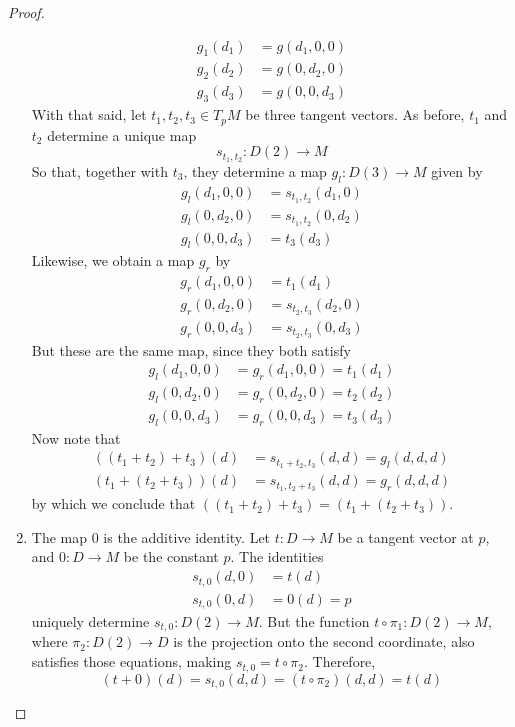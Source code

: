 \begin{proof}
\begin{enumerate}
\begin{align*}
	g_1(d_1) &= g(d_1,0,0) \\
	g_2(d_2) &= g(0,d_2,0) \\
	g_3(d_3) &= g(0,0,d_3)
      \end{align*}
      With that said, let \( t_1,t_2,t_3\in T_pM \) be three tangent vectors. As before, \( t_1 \) and \( t_2 \) determine a unique map
      \begin{equation*}
	s_{t_1,t_2}:D(2)\to M
      \end{equation*}
      So that, together with \( t_3 \), they determine a map \( g_l:D(3)\to M \) given by
      \begin{align*}
	g_l(d_1,0,0) &= s_{t_1,t_2}(d_1,0) \\
	g_l(0,d_2,0) &= s_{t_1,t_2}(0,d_2) \\
	g_l(0,0,d_3) &= t_3(d_3)
      \end{align*}
      Likewise, we obtain a map \( g_r \) by
      \begin{align*}
	g_r(d_1,0,0) &= t_1(d_1)           \\
	g_r(0,d_2,0) &= s_{t_2,t_3}(d_2,0) \\
	g_r(0,0,d_3) &= s_{t_2,t_3}(0,d_3)
      \end{align*}
      But these are the same map, since they both satisfy
      \begin{align*}
	g_l(d_1,0,0) &= g_r(d_1,0,0) = t_1(d_1) \\
	g_l(0,d_2,0) &= g_r(0,d_2,0) = t_2(d_2) \\
	g_l(0,0,d_3) &= g_r(0,0,d_3) = t_3(d_3)
      \end{align*}
      Now note that
      \begin{align*}
	((t_1+t_2)+t_3)(d) &= s_{t_1+t_2,t_3}(d,d) = g_l(d,d,d) \\
	(t_1+(t_2+t_3))(d) &= s_{t_1,t_2+t_3}(d,d) = g_r(d,d,d) 
      \end{align*}
      by which we conclude that \( ((t_1+t_2)+t_3) = (t_1+(t_2+t_3)) \).

    \item The map 0 is the additive identity. Let \( t:D\to M \) be a tangent vector at \( p \), and \( 0:D\to M \) be the constant \( p \). The identities
      \begin{align*}
	s_{t,0}(d,0) &= t(d) \\
	s_{t,0}(0,d) &= 0(d) = p
      \end{align*}
      uniquely determine \( s_{t,0}:D(2)\to M \). But the function \( t\circ \pi_1:D(2)\to M \), where \( \pi_2:D(2)\to D \) is the projection onto the second coordinate, also satisfies those equations, making \( s_{t,0} = t\circ \pi_2 \). Therefore,
      \begin{equation*}
	(t+0)(d) = s_{t,0}(d,d) = (t\circ \pi_2)(d,d) = t(d)
      \end{equation*}


\end{enumerate}
\end{proof}
